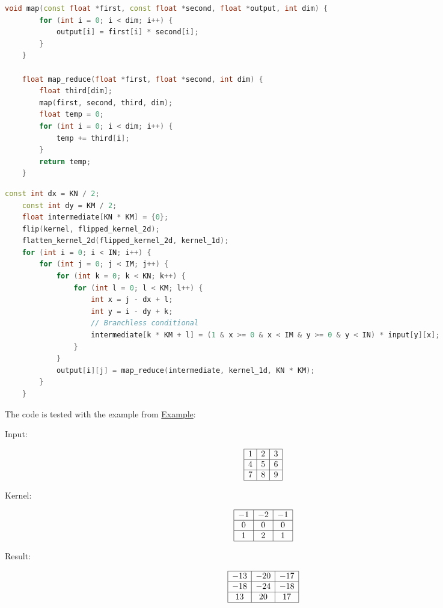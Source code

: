 \documentclass[12pt]{article}
\begin{document}
\begin{lstlisting}[language=c++]
	void map(const float *first, const float *second, float *output, int dim) {
		for (int i = 0; i < dim; i++) {
			output[i] = first[i] * second[i];
		}
	}
	
	float map_reduce(float *first, float *second, int dim) {
		float third[dim];
		map(first, second, third, dim);
		float temp = 0;
		for (int i = 0; i < dim; i++) {
			temp += third[i];
		}
		return temp;
	}
\end{lstlisting}


\begin{lstlisting}[language=c++]
    const int dx = KN / 2;
	const int dy = KM / 2;
	float intermediate[KN * KM] = {0};
	flip(kernel, flipped_kernel_2d);
	flatten_kernel_2d(flipped_kernel_2d, kernel_1d);
	for (int i = 0; i < IN; i++) {
		for (int j = 0; j < IM; j++) {
			for (int k = 0; k < KN; k++) {
				for (int l = 0; l < KM; l++) {
					int x = j - dx + l;
					int y = i - dy + k;
					// Branchless conditional
					intermediate[k * KM + l] = (1 & x >= 0 & x < IM & y >= 0 & y < IN) * input[y][x];
				}
			}
			output[i][j] = map_reduce(intermediate, kernel_1d, KN * KM);
		}
	}
\end{lstlisting}


The code is tested with  the example from \href{{http://www.songho.ca/dsp/convolution/convolution2d_example.html}}{Example}:

Input:

\begin{equation}
	\begin{array}{|c|c|c|}
		\hline 1 & 2 & 3 \\
		\hline 4 & 5 & 6 \\
		\hline 7 & 8 & 9 \\
		\hline
	\end{array}
\end{equation}

Kernel:

\begin{equation}
	\begin{array}{|c|c|c|}
		\hline-1 & -2 & -1 \\
		\hline 0 & 0 & 0 \\
		\hline 1 & 2 & 1 \\
		\hline
	\end{array}
\end{equation}

Result:

\begin{equation}
	\begin{array}{|c|c|c|}
		\hline-13 & -20 & -17 \\
		\hline-18 & -24 & -18 \\
		\hline 13 & 20 & 17 \\
		\hline
	\end{array}
\end{equation}
\end{document}

